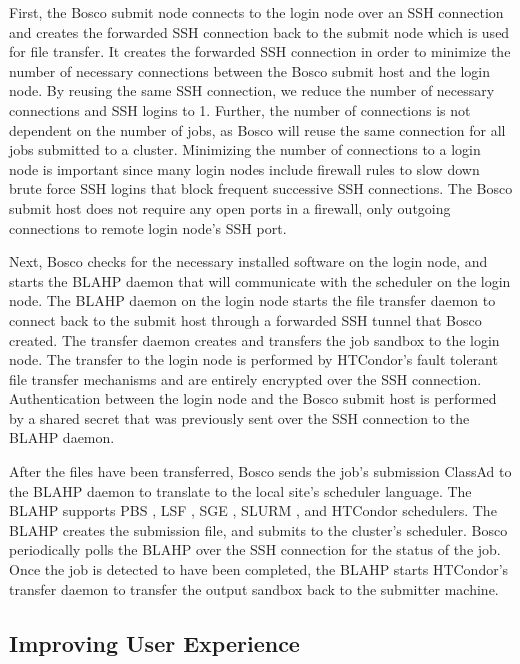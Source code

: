First, the Bosco submit node connects to the login node over an SSH connection and creates the forwarded SSH connection back to the submit node which is used for file transfer.  It creates the forwarded SSH connection in order to minimize the number of necessary connections between the Bosco submit host and the login node.  By reusing the same SSH connection, we reduce the number of necessary connections and SSH logins to 1.  Further, the number of connections is not dependent on the number of jobs, as Bosco will reuse the same connection for all jobs submitted to a cluster.  Minimizing the number of connections to a login node is important since many login nodes include firewall rules to slow down brute force SSH logins that block frequent successive SSH connections.  The Bosco submit host does not require any open ports in a firewall, only outgoing connections to remote login node's SSH port.

Next, Bosco checks for the necessary installed software on the login node, and starts the BLAHP \cite{blahp} daemon that will communicate with the scheduler on the login node.  The BLAHP daemon on the login node starts the file transfer daemon to connect back to the submit host through a forwarded SSH tunnel that Bosco created.  The transfer daemon creates and transfers the job sandbox to the login node.  The transfer to the login node is performed by HTCondor's fault tolerant file transfer mechanisms and are entirely encrypted over the SSH connection.  Authentication between the login node and the Bosco submit host is performed by a shared secret that was previously sent over the SSH connection to the BLAHP daemon.

After the files have been transferred, Bosco sends the job's submission ClassAd \cite{raman1998matchmaking} to the BLAHP daemon to translate to the local site's scheduler language.  The BLAHP supports PBS \cite{computing2013torque}, LSF \cite{computinglsf}, SGE \cite{gentzsch2001sun}, SLURM \cite{yoo2003slurm}, and HTCondor schedulers.  The BLAHP creates the submission file, and submits to the cluster's scheduler.  Bosco periodically polls the BLAHP over the SSH connection for the status of the job.  Once the job is detected to have been completed, the BLAHP starts HTCondor's transfer daemon to transfer the output sandbox back to the submitter machine.

\subsection{Improving User Experience}

